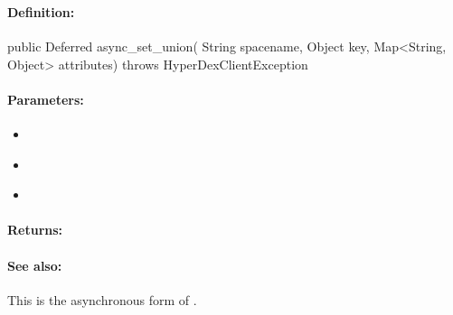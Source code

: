 \pagebreak
\subsubsection{}
\label{api:java:async_set_union}


\paragraph{Definition:}
\begin{javacode}
public Deferred async_set_union(
        String spacename,
        Object key,
        Map<String, Object> attributes) throws HyperDexClientException
\end{javacode}

\paragraph{Parameters:}
\begin{itemize}[noitemsep]
\item {}\\

\item {}\\

\item {}\\

\end{itemize}

\paragraph{Returns:}


\paragraph{See also:}  This is the asynchronous form of .

\pagebreak
\subsubsection{}
\label{api:java:cond_set_union}


